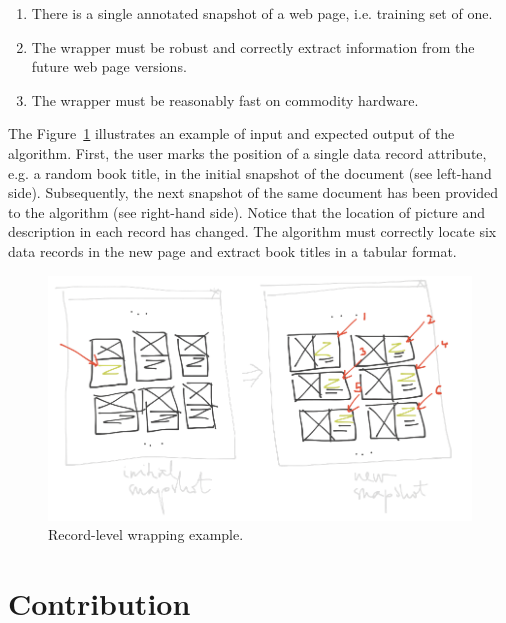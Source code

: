 \begin{enumerate}
	\item There is a single annotated snapshot of a web page, i.e. training set of one.
	\item The wrapper must be robust and correctly extract information from the future web page versions.
	\item The wrapper must be reasonably fast on commodity hardware.
\end{enumerate}


The Figure~\ref{fig:record-level-wrapping} illustrates an example of input and expected output of the algorithm. First, the user marks the position of a single data record attribute, e.g. a random book title, in the initial snapshot of the document (see left-hand side). Subsequently, the next snapshot of the same document has been provided to the algorithm (see right-hand side). Notice that the location of picture and description in each record has changed. The algorithm must correctly locate six data records in the new page and extract book titles in a tabular format.

\begin{figure}[h]
	\centering
	\includegraphics[width=1\linewidth]{figures/record-level-wrapping}
	\caption{Record-level wrapping example.}
	\label{fig:record-level-wrapping}
\end{figure}


\section{Contribution}
\label{sec:contribution}

